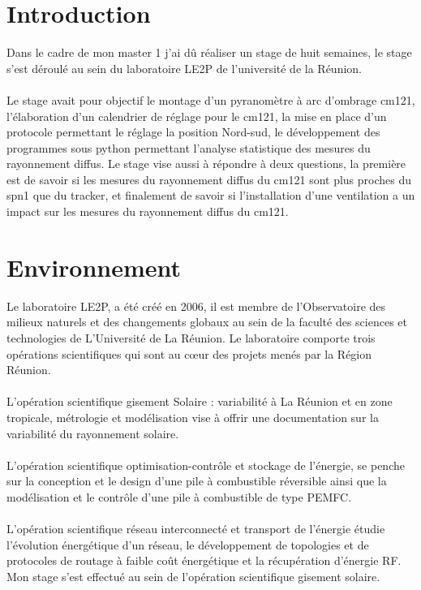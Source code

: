 \documentclass[12pt,a4paper]{article}
\begin{document}
\begin{flushleft}


\sf
\section*{Introduction}
%
\setcounter{page}{3}

Dans le cadre de mon master 1 j'ai dû réaliser un stage de huit semaines, le stage s'est déroulé au sein du laboratoire LE2P de l'université de la Réunion.\\
~\\
Le stage avait pour objectif le montage d'un pyranomètre à arc d'ombrage cm121, l'élaboration d'un calendrier de réglage pour le cm121, la mise en place d'un protocole permettant le réglage la position Nord-sud, le développement des programmes sous python permettant l'analyse statistique des mesures du rayonnement diffus. Le stage vise aussi à répondre à deux questions, la première est de savoir si les mesures du rayonnement diffus du cm121 sont plus proches  du spn1 que du tracker, et finalement de savoir si l'installation d'une ventilation a un impact sur les mesures du rayonnement diffus du cm121.
 

\section{Environnement}



Le laboratoire LE2P, a été créé en 2006,  il est membre de l’Observatoire des milieux naturels et des changements globaux au sein de la faculté des sciences et technologies de L’Université de La Réunion. Le laboratoire comporte trois opérations scientifiques qui sont au cœur des projets menés par la Région Réunion.\\
~\\
L'opération scientifique gisement Solaire : variabilité à La Réunion et en zone tropicale, métrologie et modélisation  vise à offrir une documentation sur la variabilité du rayonnement solaire.\\
~\\
L'opération scientifique optimisation-contrôle et stockage de l'énergie, se penche sur la conception et le design d’une pile à combustible réversible ainsi que la modélisation et le contrôle d’une pile à combustible de type PEMFC.\\ 
~\\
L'opération scientifique réseau interconnecté et transport de l'énergie étudie l’évolution énergétique d'un réseau, le développement de topologies et de protocoles de routage à faible coût énergétique et la récupération d’énergie RF.
~\\
Mon stage s'est effectué au sein de l'opération scientifique gisement solaire.


\end{flushleft}
\end{document}

